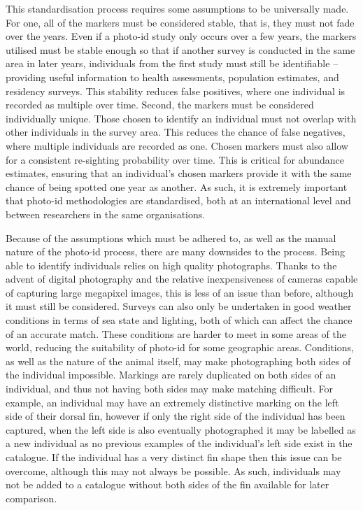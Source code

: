 This standardisation process requires some assumptions to be universally made. For one, all of the markers must be considered stable, that is, they must not fade over the years. Even if a photo-id study only occurs over a few years, the markers utilised must be stable enough so that if another survey is conducted in the same area in later years, individuals from the first study must still be identifiable -- providing useful information to health assessments, population estimates, and residency surveys. This stability reduces false positives, where one individual is recorded as multiple over time. Second, the markers must be considered individually unique. Those chosen to identify an individual must not overlap with other individuals in the survey area. This reduces the chance of false negatives, where multiple individuals are recorded as one. Chosen markers must also allow for a consistent re-sighting probability over time. This is critical for abundance estimates,  ensuring that an individual's chosen markers provide it with the same chance of being spotted one year as another. As such, it is extremely important that photo-id methodologies are standardised, both at an international level and between researchers in the same organisations. 

Because of the assumptions which must be adhered to, as well as the manual nature of the photo-id process, there are many downsides to the process. Being able to identify individuals relies on high quality photographs. Thanks to the advent of digital photography and the relative inexpensiveness of cameras capable of capturing large megapixel images, this is less of an issue than before, although it must still be considered. Surveys can also only be undertaken in good weather conditions in terms of sea state and lighting, both of which can affect the chance of an accurate match. These conditions are harder to meet in some areas of the world, reducing the suitability of photo-id for some geographic areas. Conditions, as well as the nature of the animal itself, may make photographing both sides of the individual impossible. Markings are rarely duplicated on both sides of an individual, and thus not having both sides may make matching difficult. For example, an individual may have an extremely distinctive marking on the left side of their dorsal fin, however if only the right side of the individual has been captured, when the left side is also eventually photographed it may be labelled as a new individual as no previous examples of the individual's left side exist in the catalogue. If the individual has a very distinct fin shape then this issue can be overcome, although this may not always be possible. As such, individuals may not be added to a catalogue without both sides of the fin available for later comparison. 

